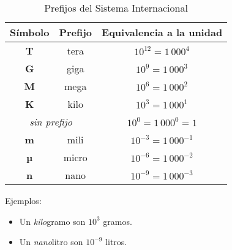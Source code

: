 \documentclass[12pt]{article}
\begin{document}
\begin{table}[h]

    \centering

    \caption{Prefijos del Sistema Internacional}
    \label{tablaPrefijoSI}

	\begin{spacing}{1.5}
	
    \begin{tabular}{ c | c | c }
        \hline
        \textbf{Símbolo} & \textbf{Prefijo} & \textbf{Equivalencia a la unidad} \\
        \hline
        \textbf{T} & tera & $10^{12}=1\,000^{4}$ \\
        \hline
        \textbf{G} & giga & $10^{9}=1\,000^{3}$ \\
        \hline
        \textbf{M} & mega & $10^{6}=1\,000^{2}$ \\
        \hline
        \textbf{K} & kilo & $10^{3}=1\,000^{1}$ \\
        \hline
        \multicolumn{2}{c|}{\emph{sin prefijo}} & $10^{0}=1\,000^{0}=1$ \\
        \hline
        \textbf{m} & mili & $10^{-3}=1\,000^{-1}$ \\
        \hline
        \textbf{µ} & micro & $10^{-6}=1\,000^{-2}$ \\
        \hline
        \textbf{n} & nano & $10^{-9}=1\,000^{-3}$ \\
        \hline
    \end{tabular}    
	\end{spacing}
\end{table}

Ejemplos:
\begin{itemize}
  \itemsep2pt \parskip0pt 
  \item   Un \emph{kilo}gramo son $10^{3}$ gramos.
  \item   Un \emph{nano}litro son $10^{-9}$ litros.
\end{itemize}
\end{document}
